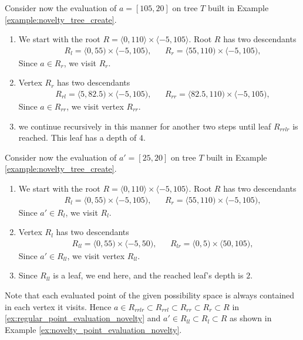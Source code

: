 \begin{example}
\label{ex:regular_point_evaluation_novelty}
    Consider now the evaluation of $a = [105,20]$ on tree $T$ built in Example \ref{example:novelty_tree_create}.

\begin{enumerate}
    \item  We start with the root $R = \langle 0,110\rangle \times \langle -5, 105 \rangle$.
    Root $R$ has two descendants 
\begin{align*}
    &R_l = \langle 0,55) \times \langle -5, 105),&
    &R_r = \langle 55,110) \times \langle -5, 105),
\end{align*}
Since $a \in R_r$, we visit $R_r$.
\item Vertex $R_r$ has two descendants
\begin{align*}
    &R_{rl} = \langle 5,82.5) \times \langle -5, 105),&
    &R_{rr} = \langle 82.5,110) \times \langle -5, 105),
\end{align*}
Since $a \in R_{rr}$, we visit vertex $R_{rr}$.
\item
we continue recursively in this manner for another two steps until leaf $R_{rrlr}$ is reached. This leaf has a depth of $4$.

\end{enumerate}
   
\end{example}

\begin{example}
\label{ex:novelty_point_evaluation_novelty}
    Consider now the evaluation of $a' = [25,20]$ on tree $T$ built in Example \ref{example:novelty_tree_create}.

\begin{enumerate}
    \item  We start with the root $R = \langle 0,110\rangle \times \langle -5, 105 \rangle$.
    Root $R$ has two descendants 
\begin{align*}
    &R_l = \langle 0,55) \times \langle -5, 105),&
    &R_r = \langle 55,110) \times \langle -5, 105),
\end{align*}
Since $a' \in R_l$, we visit $R_l$.
\item Vertex $R_l$ has two descendants
\begin{align*}
    &R_{ll} = \langle 0,55) \times \langle -5, 50),&
    &R_{lr} = \langle 0,5) \times \langle 50, 105),
\end{align*}
Since $a' \in R_{ll}$, we visit vertex $R_{ll}$.
\item
Since $R_{ll}$ is a leaf, we end here, and the reached leaf's depth is $2$.
\end{enumerate}
\end{example}
Note that each evaluated point of the given possibility space is always contained in each vertex it visits.
Hence $a \in R_{rrlr} \subset R_{rrl} \subset R_{rr} \subset R_{r} \subset R$ in \ref{ex:regular_point_evaluation_novelty}
and $a' \in R_{ll} \subset R_{l} \subset R$ as shown in Example \ref{ex:novelty_point_evaluation_novelty}.


